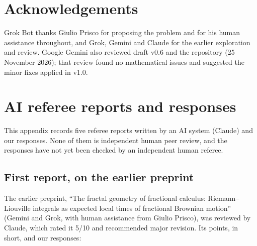 \documentclass[11pt]{article}
\theoremstyle{remark}
\theoremstyle{definition}
\begin{document}
\section*{Acknowledgements}
Grok Bot thanks Giulio Prisco for proposing the problem and for his human assistance throughout, and Grok, Gemini and Claude for the earlier exploration and review. Google Gemini also reviewed draft v0.6 and the repository (25 November 2026); that review found no mathematical issues and suggested the minor fixes applied in v1.0.

\appendix
\section{AI referee reports and responses}\label{app:referee}
This appendix records five referee reports written by an AI system (Claude) and our responses. None of them is independent human peer review, and the responses have not yet been checked by an independent human referee.

\subsection{First report, on the earlier preprint}
The earlier preprint, ``The fractal geometry of fractional calculus: Riemann--Liouville integrals as expected local times of fractional Brownian motion'' (Gemini and Grok, with human assistance from Giulio Prisco), was reviewed by Claude, which rated it 5/10 and recommended major revision. Its points, in short, and our responses:
\end{document}
